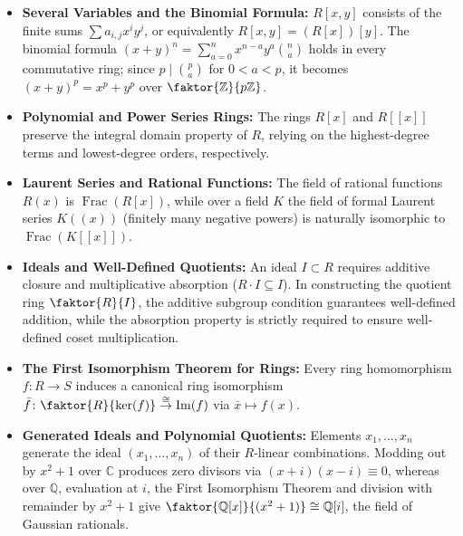 \begin{overview}
\begin{itemize}
    \item \textbf{Several Variables and the Binomial Formula:} $R[x, y]$ consists of the finite sums $\sum a_{i,j} x^i y^j$, or equivalently $R[x, y] = (R[x])[y]$. The binomial formula $(x + y)^n = \sum_{a=0}^n x^{n-a} y^a \binom{n}{a}$ holds in every commutative ring; since $p \mid \binom{p}{a}$ for $0 < a < p$, it becomes $(x + y)^p = x^p + y^p$ over $\faktor{\mathbb{Z}}{p\mathbb{Z}}$.
    \item \textbf{Polynomial and Power Series Rings:} The rings $R[x]$ and $R[[x]]$ preserve the integral domain property of $R$, relying on the highest-degree terms and lowest-degree orders, respectively.
    \item \textbf{Laurent Series and Rational Functions:} The field of rational functions $R(x)$ is $\operatorname{Frac}(R[x])$, while over a field $K$ the field of formal Laurent series $K((x))$ (finitely many negative powers) is naturally isomorphic to $\operatorname{Frac}(K[[x]])$.
    \item \textbf{Ideals and Well-Defined Quotients:} An ideal $I \subset R$ requires additive closure and multiplicative absorption ($R \cdot I \subseteq I$). In constructing the quotient ring $\faktor{R}{I}$, the additive subgroup condition guarantees well-defined addition, while the absorption property is strictly required to ensure well-defined coset multiplication.
    \item \textbf{The First Isomorphism Theorem for Rings:} Every ring homomorphism $f \colon R \to S$ induces a canonical ring isomorphism $\bar{f} \colon \faktor{R}{\ker(f)} \overset{\cong}{\to} \operatorname{Im}(f)$ via $\bar{x} \mapsto f(x)$.
    \item \textbf{Generated Ideals and Polynomial Quotients:} Elements $x_1, \dots, x_n$ generate the ideal $(x_1, \dots, x_n)$ of their $R$-linear combinations. Modding out by $x^2+1$ over $\mathbb{C}$ produces zero divisors via $(x+i)(x-i) \equiv 0$, whereas over $\mathbb{Q}$, evaluation at $i$, the First Isomorphism Theorem and division with remainder by $x^2 + 1$ give $\faktor{\mathbb{Q}[x]}{(x^2+1)} \cong \mathbb{Q}[i]$, the field of Gaussian rationals.
\end{itemize}
\end{overview}

